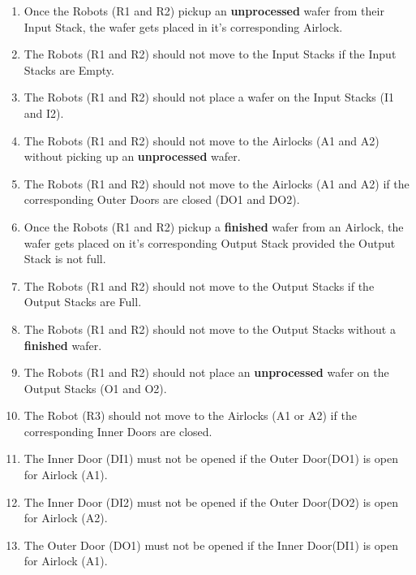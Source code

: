 \documentclass[a4paper,12pt]{article}
\begin{document}
	\begin{enumerate}
		
		\item Once the Robots (R1 and R2) pickup an \textbf{unprocessed} wafer from their Input Stack, the wafer gets placed in it's corresponding Airlock.
		
		\item The Robots (R1 and R2) should not move to the Input Stacks if the Input Stacks are Empty.
		
		\item The Robots (R1 and R2) should not place a wafer on the Input Stacks (I1 and I2).
		
		\item The Robots (R1 and R2) should not move to the Airlocks (A1 and A2) without picking up an \textbf{unprocessed} wafer.
		
		\item The Robots (R1 and R2) should not move to the Airlocks (A1 and A2) if the corresponding Outer Doors are closed (DO1 and DO2).
		
		\item Once the Robots (R1 and R2) pickup a \textbf{finished} wafer from an Airlock, the wafer gets placed on it's corresponding Output Stack provided the Output Stack is not full.
		
		\item The Robots (R1 and R2) should not move to the Output Stacks if the Output Stacks are Full.
		
		\item The Robots (R1 and R2) should not move to the Output Stacks without a \textbf{finished} wafer.
		
		\item The Robots (R1 and R2) should not place an \textbf{unprocessed} wafer on the Output Stacks (O1 and O2).
		
		\item The Robot (R3) should not move to the Airlocks (A1 or A2) if the corresponding Inner Doors are closed.
		
		\item The Inner Door (DI1) must not be opened if the Outer Door(DO1) is open for Airlock (A1).
		
		\item The Inner Door (DI2) must not be opened if the Outer Door(DO2) is open for Airlock (A2).
		
		\item The Outer Door (DO1) must not be opened if the Inner Door(DI1) is open for Airlock (A1).
		

\end{enumerate}
\end{document}
